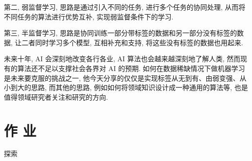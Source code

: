 第二, 弱监督学习, 思路是通过引入不同的任务, 进行多个任务的协同处理, 从而将不同任务的算法进行优势互补, 实现弱监督条件下的学习.

第三, 半监督学习, 思路是协同训练一部分带标签的数据和另一部分没有标签的数据, 让二者同时学习多个模型, 互相补充和支持, 将这些没有标签的数据也用起来.

未来十年, AI 会深刻地改变各行各业, AI 算法也会越来越深刻地了解人类, 然而现有的算法还不足以支撑社会各界对 AI 的预期. 如何在数据稀缺情况下做机器学习是未来要克服的挑战之一, 他今天分享的仅仅是实现标签从无到有、由弱变强、从小到大的思路, 而其他的思路, 例如如何将领域知识设计成一种通用的算法等, 也是值得领域研究者关注和研究的方向. 

\section{作 业 }
\begin{custom}[explorecolor]{探索}

\end{custom}

\begin{think}

\end{think} 